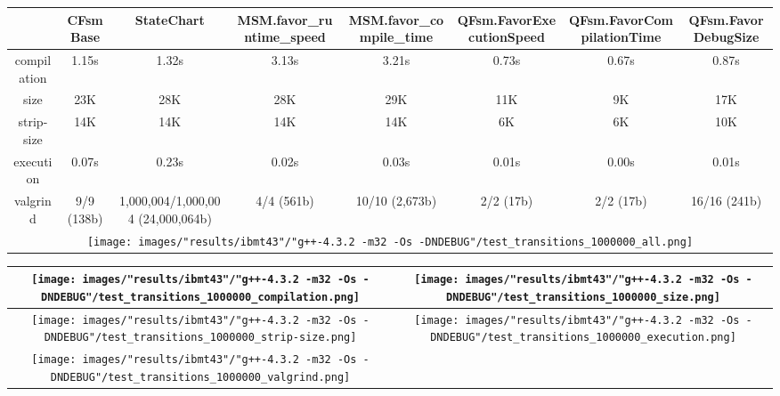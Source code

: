 \begin{landscape}
\begin{table}
\caption{"ibmt43" [df6407d], g++-4.3.2 -m32 -Os -DNDEBUG/test transitions 1000000}
\centering
\begin{longtable}{| c | c |c |c |c |c |c |c |}
\hline
& CFsmBase& StateChart& MSM.favor\_runtime\_speed& MSM.favor\_compile\_time& QFsm.FavorExecutionSpeed& QFsm.FavorCompilationTime& QFsm.FavorDebugSize\\
\hline
compilation & 1.15s & 1.32s & 3.13s & 3.21s & 0.73s & 0.67s & 0.87s\\
\hline
size & 23K & 28K & 28K & 29K & 11K & 9K & 17K\\
\hline
strip-size & 14K & 14K & 14K & 14K & 6K & 6K & 10K\\
\hline
execution & 0.07s & 0.23s & 0.02s & 0.03s & 0.01s & 0.00s & 0.01s\\
\hline
valgrind & 9/9 (138b) & 1,000,004/1,000,004 (24,000,064b) & 4/4 (561b) & 10/10 (2,673b) & 2/2 (17b) & 2/2 (17b) & 16/16 (241b)\\
\hline
\multicolumn{8}{|c|}{\texttt{[image: images/"results/ibmt43"/"g++-4.3.2 -m32 -Os -DNDEBUG"/test\_transitions\_1000000\_all.png]}}\\
\hline
\end{longtable}
\end{table}
\end{landscape}
\newpage
\begin{table}
\centering
\begin{longtable}{| c | c |}
\hline
\texttt{[image: images/"results/ibmt43"/"g++-4.3.2 -m32 -Os -DNDEBUG"/test\_transitions\_1000000\_compilation.png]}& \texttt{[image: images/"results/ibmt43"/"g++-4.3.2 -m32 -Os -DNDEBUG"/test\_transitions\_1000000\_size.png]}\\
\hline
\texttt{[image: images/"results/ibmt43"/"g++-4.3.2 -m32 -Os -DNDEBUG"/test\_transitions\_1000000\_strip-size.png]}& \texttt{[image: images/"results/ibmt43"/"g++-4.3.2 -m32 -Os -DNDEBUG"/test\_transitions\_1000000\_execution.png]}\\
\hline
\texttt{[image: images/"results/ibmt43"/"g++-4.3.2 -m32 -Os -DNDEBUG"/test\_transitions\_1000000\_valgrind.png]}& \\ \hline
\end{longtable}
\end{table}
